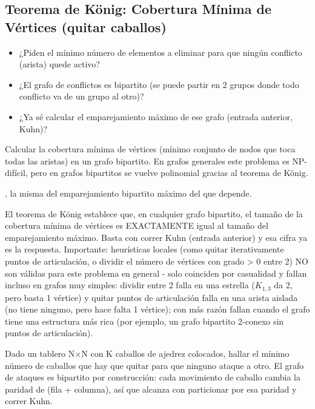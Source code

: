 \subsection{Teorema de König: Cobertura Mínima de Vértices (quitar caballos)}
\label{alg:4-3}


\begin{itemize}
\item ¿Piden el mínimo número de elementos a eliminar para que ningún conflicto (arista) quede activo?
\item ¿El grafo de conflictos es bipartito (se puede partir en 2 grupos donde todo conflicto va de un grupo al otro)?
\item ¿Ya sé calcular el emparejamiento máximo de ese grafo (entrada anterior, Kuhn)?
\end{itemize}

 Calcular la cobertura mínima de vértices (mínimo conjunto de nodos que toca todas las aristas) en un grafo bipartito. En grafos generales este problema es NP-difícil, pero en grafos bipartitos se vuelve polinomial gracias al teorema de König.

 , la misma del emparejamiento bipartito máximo del que depende.

 El teorema de König establece que, en cualquier grafo bipartito, el tamaño de la cobertura mínima de vértices es EXACTAMENTE igual al tamaño del emparejamiento máximo. Basta con correr Kuhn (entrada anterior) y esa cifra ya es la respuesta. Importante: heurísticas locales (como quitar iterativamente puntos de articulación, o dividir el número de vértices con grado \textgreater{} 0 entre 2) NO son válidas para este problema en general - solo coinciden por casualidad y fallan incluso en grafos muy simples: dividir entre 2 falla en una estrella ($K_{1,3}$ da 2, pero basta 1 vértice) y quitar puntos de articulación falla en una arista aislada (no tiene ninguno, pero hace falta 1 vértice); con más razón fallan cuando el grafo tiene una estructura más rica (por ejemplo, un grafo bipartito 2-conexo sin puntos de articulación).~\cite{konig1931}


Dado un tablero N×N con K caballos de ajedrez colocados, hallar el mínimo número de caballos que hay que quitar para que ninguno ataque a otro. El grafo de ataques es bipartito por construcción: cada movimiento de caballo cambia la paridad de (fila + columna), así que alcanza con particionar por esa paridad y correr Kuhn.

